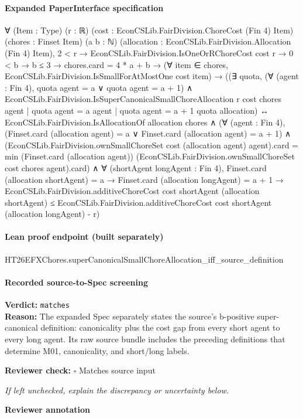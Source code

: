 \documentclass[10pt]{article}
\newcommand{\reviewerbox}{%
  \par\noindent\fbox{\parbox{0.96\linewidth}{\rule{0pt}{0.38in}}}\par
}
\newcommand{\reviewmatch}[1]{%
  \par\noindent\textbf{Reviewer check:} $\square$\; #1\par
  \noindent\emph{If left unchecked, explain the discrepancy or uncertainty below.}\par
}
\begin{document}
\paragraph{Expanded PaperInterface specification}
\begin{ReviewVerbatim}
∀ (Item : Type) (r : ℝ) (cost : EconCSLib.FairDivision.ChoreCost (Fin 4) Item) (chores : Finset Item) (a b : ℕ)
  (allocation : EconCSLib.FairDivision.Allocation (Fin 4) Item),
  2 < r →
    EconCSLib.FairDivision.IsOneOrRChoreCost cost r →
      0 < b →
        b ≤ 3 →
          chores.card = 4 * a + b →
            (∀ item ∈ chores, EconCSLib.FairDivision.IsSmallForAtMostOne cost item) →
              ((∃ quota,
                  (∀ (agent : Fin 4), quota agent = a ∨ quota agent = a + 1) ∧
                    EconCSLib.FairDivision.IsSuperCanonicalSmallChoreAllocation r cost chores {agent | quota agent = a}
                      {agent | quota agent = a + 1} quota allocation) ↔
                EconCSLib.FairDivision.IsAllocationOf allocation chores ∧
                  (∀ (agent : Fin 4),
                      (Finset.card (allocation agent) = a ∨ Finset.card (allocation agent) = a + 1) ∧
                        (EconCSLib.FairDivision.ownSmallChoreSet cost (allocation agent) agent).card =
                          min (Finset.card (allocation agent))
                            (EconCSLib.FairDivision.ownSmallChoreSet cost chores agent).card) ∧
                    ∀ (shortAgent longAgent : Fin 4),
                      Finset.card (allocation shortAgent) = a →
                        Finset.card (allocation longAgent) = a + 1 →
                          EconCSLib.FairDivision.additiveChoreCost cost shortAgent (allocation shortAgent) ≤
                            EconCSLib.FairDivision.additiveChoreCost cost shortAgent (allocation longAgent) - r)
\end{ReviewVerbatim}

\paragraph{Lean proof endpoint (built separately)}\begin{ReviewVerbatim}
HT26EFXChores.superCanonicalSmallChoreAllocation_iff_source_definition
\end{ReviewVerbatim}

\paragraph{Recorded source-to-Spec screening}
\textbf{Verdict:} \texttt{matches}
\\
\textbf{Reason:} The expanded Spec separately states the source's b-positive super-canonical definition: canonicality plus the cost gap from every short agent to every long agent. Its raw source bundle includes the preceding definitions that determine M01, canonicality, and short/long labels.
\reviewmatch{Matches source input}
\noindent\textbf{Reviewer annotation}\par
\reviewerbox
\clearpage
\hypertarget{source-claim-707062c38758c055}{}
\end{document}
